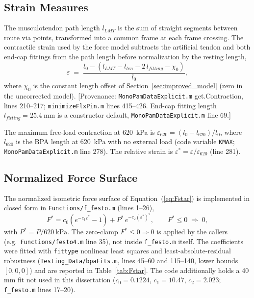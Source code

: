 \subsection{Strain Measures}
The musculotendon path length $l_{LMT}$ is the sum of straight segments between route via points, transformed into a common frame at each frame crossing. The contractile strain used by the force model subtracts the artificial tendon and both end-cap fittings from the path length before normalization by the resting length,
\begin{equation}
    \varepsilon \;=\; \frac{l_{0} - \left(l_{LMT} - l_{ten} - 2\,l_{fitting} - \chi_{0}\right)}{l_{0}},
    \label{eq:app_strain}
\end{equation}
where $\chi_{0}$ is the constant length offset of Section~\ref{sec:improved_model} (zero in the uncorrected model). [Provenance: \texttt{MonoPamDataExplicit.m} get.Contraction, lines 210--217; \texttt{minimizeFlxPin.m} lines 415--426. End-cap fitting length $l_{fitting}=\qty{25.4}{\mm}$ is a constructor default, \texttt{MonoPamDataExplicit.m} line 69.]

The maximum free-load contraction at \qty{620}{\kPa} is $\varepsilon_{620} = (l_{0}-l_{620})/l_{0}$, where $l_{620}$ is the BPA length at \qty{620}{\kPa} with no external load (code variable \texttt{KMAX}; \texttt{MonoPamDataExplicit.m} line 278). The relative strain is $\varepsilon^{*} = \varepsilon / \varepsilon_{620}$ (line 281).

\subsection{Normalized Force Surface}
The normalized isometric force surface of Equation~(\ref{eq:Fstar}) is implemented in closed form in \texttt{Functions/f\_festo.m} (lines 1--26),
\begin{equation}
    F^{*} = c_{0}\left(e^{-c_{1}\varepsilon^{*}} - 1\right)
            + P^{*}\,e^{-c_{2}(\varepsilon^{*})^{2}},
    \qquad F^{*}\le 0 \;\Rightarrow\; 0,
    \label{eq:app_fstar}
\end{equation}
with $P^{*} = P/\qty{620}{\kPa}$. The zero-clamp $F^{*}\le 0 \Rightarrow 0$ is applied by the callers (e.g.\ \texttt{Functions/festo4.m} line 35), not inside \texttt{f\_festo.m} itself. The coefficients were fitted with \texttt{fittype} nonlinear least squares and least-absolute-residual robustness (\texttt{Testing\_Data/bpaFits.m}, lines 45--60 and 115--140, lower bounds $[0,0,0]$) and are reported in Table~\ref{tab:Fstar}. The code additionally holds a 40\,mm fit not used in this dissertation ($c_0 = 0.1224$, $c_1 = 10.47$, $c_2 = 2.023$; \texttt{f\_festo.m} lines 17--20).

